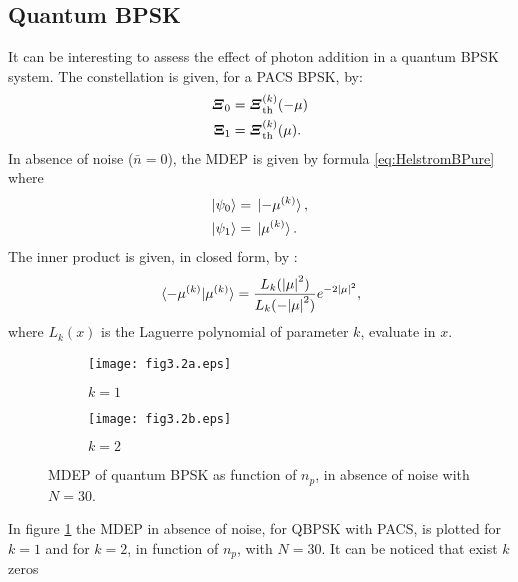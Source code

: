     \subsection{Quantum BPSK}
    It can be interesting to assess the effect of photon addition in a quantum BPSK system.
    The constellation is given, for a PACS BPSK, by:
    \begin{subequations}\begin{align}
        \Operator{\varXi}_0 &=  \Operator{\varXi}_{\mathrm{th}}^{(k)}(-\mu)\\
        \Operator{\Xi}_1 &=  \Operator{\varXi}_{\mathrm{th}}^{(k)}(\mu).
    \end{align}\end{subequations}
    In absence of noise ($\bar{n}=0$), the MDEP is given by formula \ref{eq:HelstromBPure} where
    \begin{subequations}
        \begin{align}
            \ket{\psi_0}&=\ket*{-\mu^{(k)}},\\
            \ket{\psi_1}&=\ket*{\mu^{(k)}}.
        \end{align}
    \end{subequations}
    The inner product is given, in closed form, by \cite{PACSDisc}:
    \begin{equation}
        \braket*{-\mu^{(k)}}{\mu^{(k)}} = \frac{L_k(\absolutevalue{\mu}^2)}{L_k(-\absolutevalue{\mu}^2)}
        e^{-2\absolutevalue{\mu}^2},
        \label{eq:innerp_nonNoise}
    \end{equation}
    where $L_k(x)$ is the Laguerre polynomial of parameter $k$, evaluate in $x$.
    \begin{figure}[t]
        \begin{subfigure}{0.5\textwidth}
            \texttt{[image: fig3.2a.eps]}
            \caption{$k=1$}
        \end{subfigure}
        \begin{subfigure}{0.5\textwidth}
            \texttt{[image: fig3.2b.eps]}
            \caption{$k=2$}
        \end{subfigure}
        \caption{MDEP of quantum BPSK as function of $n_p$, in absence of noise with $N=30$.}
        \label{fig:3.2}
    \end{figure}
    In figure \ref{fig:3.2} the MDEP in absence of noise, for QBPSK with PACS, is plotted for
    $k=1$ and for $k=2$, in function of $n_p$, with $N=30$. It can be noticed that exist $k$ zeros
